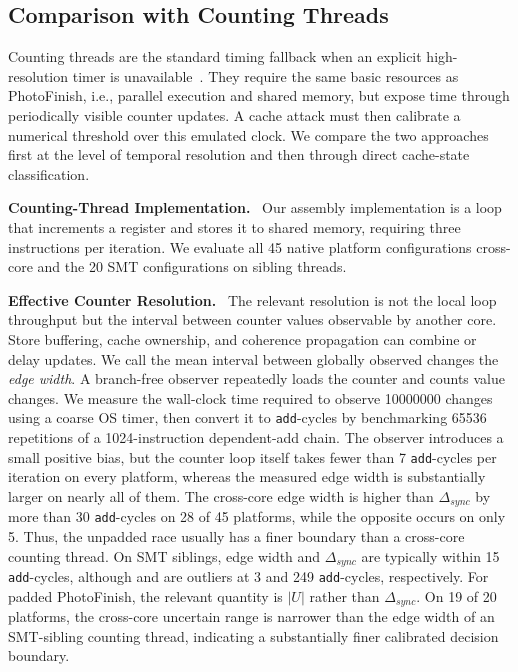 \documentclass[letterpaper,twocolumn,10pt]{article} %
\newcommand{\paragrabf}[1]{\noindent \textbf{#1.}\ }
\newcommand{\AttackName}{PhotoFinish\xspace}
\newcommand{\rdelta}[1]{$\Delta_{#1}$}
\begin{document}
\subsection{Comparison with Counting Threads}\label{subsec:comparison-to-counter-threads}

Counting threads are the standard timing fallback when an explicit high-resolution timer is unavailable~\cite{Wray1992,Lipp2016,Schwarz2017Timers,Gras2017aslr,Schwarz2020malware,Hetterich2022Branch}.
They require the same basic resources as \AttackName, i.e., parallel execution and shared memory, but expose time through periodically visible counter updates.
A cache attack must then calibrate a numerical threshold over this emulated clock.
We compare the two approaches first at the level of temporal resolution and then through direct cache-state classification.

\paragrabf{Counting-Thread Implementation}
Our assembly implementation is a loop that increments a register and stores it to shared memory, requiring three instructions per iteration.
We evaluate all \num{45} native platform configurations cross-core and the \num{20} SMT configurations on sibling threads.

\paragrabf{Effective Counter Resolution}
The relevant resolution is not the local loop throughput but the interval between counter values observable by another core.
Store buffering, cache ownership, and coherence propagation can combine or delay updates.
We call the mean interval between globally observed changes the \emph{edge width}.
A branch-free observer repeatedly loads the counter and counts value changes.
We measure the wall-clock time required to observe \num{10000000} changes using a coarse OS timer, then convert it to \texttt{add}-cycles by benchmarking \num{65536} repetitions of a \num{1024}-instruction dependent-add chain.
The observer introduces a small positive bias, but the counter loop itself takes fewer than \num{7} \texttt{add}-cycles per iteration on every platform, whereas the measured edge width is substantially larger on nearly all of them.
The cross-core edge width is higher than \rdelta{sync} by more than \num{30} \texttt{add}-cycles on \num{28} of \num{45} platforms, while the opposite occurs on only \num{5}.
Thus, the unpadded race usually has a finer boundary than a cross-core counting thread.
On SMT siblings, edge width and \rdelta{sync} are typically within \num{15} \texttt{add}-cycles, although \labninetyoneCPU and \labseventynineCPU are outliers at \num{3} and \num{249} \texttt{add}-cycles, respectively.
For padded \AttackName, the relevant quantity is $|U|$ rather than \rdelta{sync}.
On \num{19} of \num{20} platforms, the cross-core uncertain range is narrower than the edge width of an SMT-sibling counting thread, indicating a substantially finer calibrated decision boundary.
\end{document}
